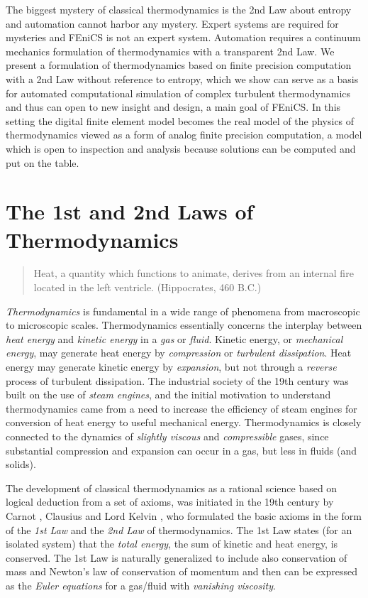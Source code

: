 The biggest mystery of classical thermodynamics is the 2nd Law about entropy and
automation cannot harbor any mystery.
Expert systems are required for mysteries and FEniCS is not an expert system.
Automation requires a continuum mechanics formulation of thermodynamics with a
transparent 2nd Law.
We present a formulation of thermodynamics based on finite precision computation
with a 2nd Law without
reference to entropy, which we show can serve as a basis for automated
computational simulation of complex turbulent thermodynamics
and thus can open to new insight and design, a main goal of FEniCS. In this
setting the digital finite element model becomes the
real model of the physics of thermodynamics viewed as a form of analog finite
precision computation, a model which is open to
inspection and analysis because solutions can be computed and put on the table.

\section{The 1st and 2nd Laws of Thermodynamics}

\small
\begin{quote} Heat, a quantity which functions to animate, derives
from an internal fire located in the left ventricle. (Hippocrates, 460 B.C.)
\end{quote}
\small
\normalsize

\emph{Thermodynamics} is fundamental in a wide range of phenomena from
macroscopic to microscopic scales.
Thermodynamics essentially concerns the interplay between \emph{heat energy}
and \emph{kinetic energy} in a \emph{gas} or \emph{fluid}.
Kinetic energy, or \emph{mechanical energy},
may generate heat energy by
\emph{compression}
or \emph{turbulent dissipation}.
Heat energy may generate kinetic energy by \emph{expansion}, but
not through a \emph{reverse} process of turbulent dissipation.
The industrial society
of the 19th century was built on the use of \emph{steam engines}, and the
initial motivation to understand thermodynamics came from a need to
increase the efficiency of steam engines for conversion of heat energy to
useful mechanical energy.
Thermodynamics is closely connected to the dynamics of \emph{slightly viscous}
and \emph{compressible} gases, since substantial compression and
expansion can occur in a gas, but less in fluids (and solids).

The development of classical thermodynamics as a rational science
based on logical deduction from a set of axioms, was initiated in
the 19th century by Carnot \cite{carnot}, Clausius
\cite{claus1984} and Lord Kelvin \cite{kelvin}, who formulated
the basic axioms in the form of the \emph{1st Law} and the \emph{2nd Law} of
thermodynamics. The 1st Law states (for an isolated system)
that the \emph{total energy},
the sum of kinetic and heat energy, is conserved.
The 1st Law is naturally generalized to include also conservation
of mass and Newton's law of conservation of momentum and then
can be expressed as the \emph{Euler equations} for  a gas/fluid
with \emph{vanishing viscosity}.

